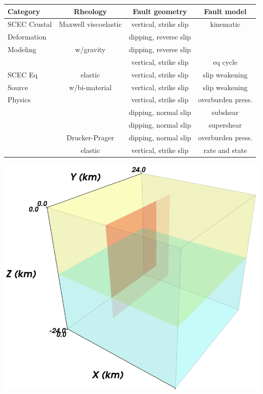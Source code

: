 \documentclass[pdftex,cig,slideColor]{pp4slides}
\begin{document}
{\small
  \begin{center}
    \begin{tabular}{lccc}
      Category & Rheology & Fault geometry & Fault model \\ \hline
      SCEC Crustal & Maxwell viscoelastic & vertical, strike slip & kinematic \\
      Deformation & & dipping, reverse slip & \\
      Modeling & w/gravity & dipping, reverse slip & \\
      & & vertical, strike slip & eq cycle \\ \hline
      SCEC Eq & elastic & vertical, strike slip & slip weakening \\
      Source & w/bi-material & vertical, strike slip & slip weakening \\
      Physics &            & vertical, strike slip & overburden press. \\
              &            & dipping, normal slip & subshear \\
              &            & dipping, normal slip & supershear \\
              & Drucker-Prager & dipping, normal slip & overburden press. \\
              & elastic & vertical, strike slip & rate and state \\ \hline
   \end{tabular}
  \end{center}
}
  
  \summary{}


  \vfill
  \begin{center}
    \includegraphics[scale=0.55]{figs/strikeslipnog_geometry}
  \end{center}
  \vfill
\end{document}
